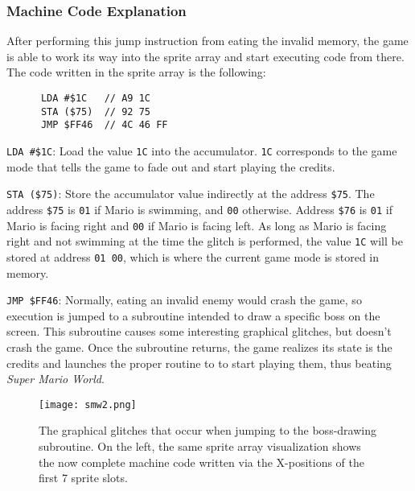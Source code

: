 \subsubsection{Machine Code Explanation}

After performing this jump instruction from eating the invalid memory, the game is able to work its way into the sprite array and start executing code from there. The code written in the sprite array is the following:

      \begin{lstlisting}
      LDA #$1C   // A9 1C
      STA ($75)  // 92 75
      JMP $FF46  // 4C 46 FF
      \end{lstlisting}

\texttt{LDA \#\$1C}: Load the value \texttt{1C} into the accumulator. \texttt{1C} corresponds to the game mode that tells the game to fade out and start playing the credits.

\texttt{STA (\$75)}: Store the accumulator value indirectly at the address \texttt{\$75}. The address \texttt{\$75} is \texttt{01} if Mario is swimming, and \texttt{00} otherwise. Address \texttt{\$76} is \texttt{01} if Mario is facing right and \texttt{00} if Mario is facing left. As long as Mario is facing right and not swimming at the time the glitch is performed, the value \texttt{1C} will be stored at address \texttt{01 00}, which is where the current game mode is stored in memory.

\texttt{JMP \$FF46}: Normally, eating an invalid enemy would crash the game, so execution is jumped to a subroutine intended to draw a specific boss on the screen. This subroutine causes some interesting graphical glitches, but doesn’t crash the game. Once the subroutine returns, the game realizes its state is the credits and launches the proper routine to to start playing them, thus beating \textit{Super Mario World}.

\begin{figure}
\texttt{[image: smw2.png]}
\caption{The graphical glitches that occur when jumping to the boss-drawing subroutine. On the left, the same sprite array visualization shows the now complete machine code written via the X-positions of the first 7 sprite slots. \cite{dotsarecool_2015}}
\end{figure}

